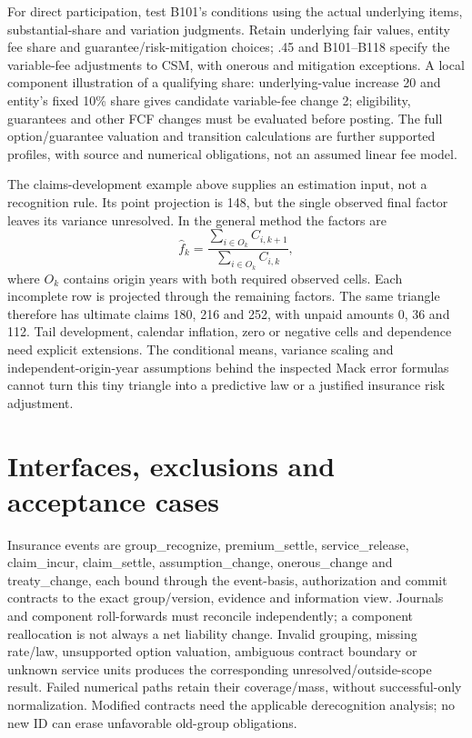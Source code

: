 For direct participation, test B101's conditions using the actual underlying items, substantial-share and variation judgments. Retain underlying fair values, entity fee share and guarantee/risk-mitigation choices; .45 and B101--B118 specify the variable-fee adjustments to CSM, with onerous and mitigation exceptions. A local component illustration of a qualifying share: underlying-value increase 20 and entity's fixed 10\% share gives candidate variable-fee change 2; eligibility, guarantees and other FCF changes must be evaluated before posting. The full option/guarantee valuation and transition calculations are further supported profiles, with source and numerical obligations, not an assumed linear fee model.

The claims-development example above supplies an estimation input, not a
recognition rule. Its point projection is 148, but the single observed final
factor leaves its variance unresolved. In the general method the factors are
\[
 \widehat f_k=\frac{\sum_{i\in O_k} C_{i,k+1}}{\sum_{i\in O_k}C_{i,k}},
\]
where $O_k$ contains origin years with both required observed cells. Each
incomplete row is projected through the remaining factors. The same triangle
therefore has ultimate claims 180, 216 and 252, with unpaid amounts 0, 36 and
112. Tail development, calendar inflation, zero or negative cells and dependence
need explicit extensions. The conditional means, variance scaling and
independent-origin-year assumptions behind the inspected Mack error formulas
\citep[equations (1)--(3), Theorems 1--3]{mack1993} cannot turn this tiny
triangle into a predictive law or a justified insurance risk adjustment.

\hypertarget{interfaces-exclusions-and-acceptance-cases}{%
\section{Interfaces, exclusions and acceptance cases}\label{method-insurance-methods-interfaces-exclusions-and-acceptance-cases}}

Insurance events are group\_recognize, premium\_settle, service\_release, claim\_incur, claim\_settle, assumption\_change, onerous\_change and treaty\_change, each bound through the event-basis, authorization and commit contracts to the exact group/version, evidence and information view. Journals and component roll-forwards must reconcile independently; a component reallocation is not always a net liability change. Invalid grouping, missing rate/law, unsupported option valuation, ambiguous contract boundary or unknown service units produces the corresponding unresolved/outside-scope result. Failed numerical paths retain their coverage/mass, without successful-only normalization. Modified contracts need the applicable derecognition analysis; no new ID can erase unfavorable old-group obligations.

